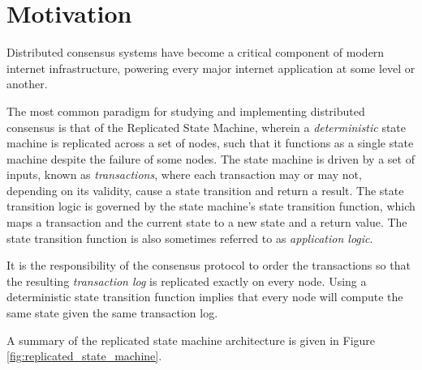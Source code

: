 \chapter{Motivation}
\label{ch:motivation}

Distributed consensus systems have become a critical component of modern internet infrastructure, powering every major internet application at some level or another.

The most common paradigm for studying and implementing distributed consensus is that of the Replicated State Machine, 
wherein a \emph{deterministic} state machine is replicated across a set of nodes, 
such that it functions as a single state machine despite the failure of some nodes.
The state machine is driven by a set of inputs, known as \emph{transactions}, 
where each transaction may or may not, depending on its validity, cause a state transition and return a result.
The state transition logic is governed by the state machine's state transition function,
which maps a transaction and the current state to a new state and a return value.
The state transition function is also sometimes referred to as \emph{application logic}.

It is the responsibility of the consensus protocol to order the transactions so that the resulting 
\emph{transaction log} is replicated exactly on every node.
Using a deterministic state transition function implies that 
every node will compute the same state given the same transaction log.

A summary of the replicated state machine architecture is given in Figure \ref{fig:replicated_state_machine}.


